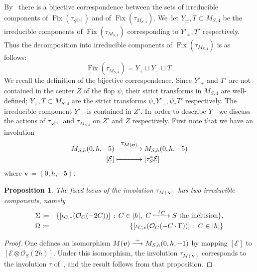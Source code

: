 \documentclass[11pt]{article}
\newcommand\To[1]{\mathchoice{\xrightarrow{\textstyle\kern4pt#1\kern3pt}}{\stackrel{#1}{\longrightarrow}}{}{}}
\newcommand\Hto[1]{\mathrel{\lhook\joinrel\To{#1}}}
\newcommand\Mto[1]{\mathrel{\mapstochar\To{#1}}}
\newcommand\cE{\mathcal{E}}
\newcommand\cO{\mathcal{O}}
\newcommand\vv{\ensuremath{\boldsymbol v}}
\DeclareMathOperator{\Fix}{Fix}
\newtheorem{prop}[lemm]{Proposition}
\theoremstyle{definition}
\begin{document}
By~\cite[\S 5.1]{involutions1} there is a bijective correspondence between the sets of irreducible components of $\Fix(\tau_{S^{[4]}})$ and of $\Fix(\tau_{M_{S,4}})$. We~let $Y_{\pm},T\subset M_{S,4}$ be the irreducible components of $\Fix(\tau_{M_{S,4}})$ corresponding to
$Y'_{\pm},T'$ respectively.
Thus the decomposition into irreducible components of $\Fix(\tau_{M_{S,4}})$ is as follows:
\begin{equation*}
\Fix(\tau_{M_{S,4}})=Y_+\sqcup Y_-\sqcup T.
\end{equation*}
We recall the definition of the bijective correspondence. Since $Y'_{+}$ and $T'$ are not contained in the center $Z$ of the flop $\psi$, their strict transforms in $M_{S,4}$ are well-defined;
$Y_{+},T\subset M_{S,4}$ are the strict transforms $\psi_*Y'_{+},\psi_*T'$ respectively. The irreducible component $Y'_{-}$ is contained in $Z'$. In~order to describe $Y_{-}$ we discuss the actions of $\tau_{S^{[4]}}$ and $\tau_{M_{S,4}}$ on $Z'$ and $Z$ respectively. First note that we have an involution
\begin{equation*}\label{azionequattro}
\begin{aligned}
M_{S,h}(0,h,-5) & \To{\tau_{M(\vv)}} M_{S,h}(0,h,-5) \\
[\cE] & \Mto{\hphantom{\tau_{M(\vv)}}} [\tau_S^{*}\cE]
\end{aligned}
\end{equation*}
where $\vv\coloneqq (0,h,-5)$.

\begin{prop}\label{prop:fissidimdue}
The fixed locus of the involution $\tau_{M(\vv)}$ has two irreducible components, namely
\begin{eqnarray*}
\Sigma & \coloneqq & \{[\iota_{C,*}(\cO_C(-2C))]\,:\, C\in|h|,\
\text{$C\Hto{\iota_{C}} S$ the inclusion}\}, \\
\Omega & \coloneqq & \{[\iota_{C,*}(\cO_C(-C\cdot\Gamma))]\,:\, C\in|h|\}
\end{eqnarray*}
\end{prop}

\begin{proof}
One defines an isomorphism $M(\vv)\To{\sim} M_{S,h}(0,h,-1)$ by mapping $[\cE]$ to $[\cE\otimes\cO_S(2h)]$. Under this isomorphism, the involution $\tau_{M(\vv)}$ corresponds to the involution
$\tau$ of~\cite[Prop.\,4.1]{involutions1}, and the result follows from that proposition.
\end{proof}
\end{document}

